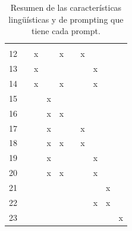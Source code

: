 \begin{landscape}
\begin{table}[]
{\begin{tabular}{@{}clllllllll@{}}
   &
   &
   \\
12 &
   &
  \multicolumn{1}{c}{x} &
   &
  \multicolumn{1}{c}{x} &
   &
  \multicolumn{1}{c}{x} &
   &
   &
   \\
13 &
   &
  \multicolumn{1}{c}{x} &
   &
   &
   &
   &
  \multicolumn{1}{c}{x} &
   &
   \\
14 &
   &
  \multicolumn{1}{c}{x} &
   &
  \multicolumn{1}{c}{x} &
   &
   &
  \multicolumn{1}{c}{x} &
   &
   \\
15 &
   &
   &
  \multicolumn{1}{c}{x} &
   &
   &
   &
   &
   &
   \\
16 &
   &
   &
  \multicolumn{1}{c}{x} &
  \multicolumn{1}{c}{x} &
   &
   &
   &
   &
   \\
17 &
   &
   &
  \multicolumn{1}{c}{x} &
   &
   &
  \multicolumn{1}{c}{x} &
   &
   &
   \\
18 &
   &
   &
  \multicolumn{1}{c}{x} &
  \multicolumn{1}{c}{x} &
   &
  \multicolumn{1}{c}{x} &
   &
   &
   \\
19 &
   &
   &
  \multicolumn{1}{c}{x} &
   &
   &
   &
  \multicolumn{1}{c}{x} &
   &
   \\
20 &
   &
   &
  \multicolumn{1}{c}{x} &
  \multicolumn{1}{c}{x} &
   &
   &
  \multicolumn{1}{c}{x} &
   &
   \\
21 &
   &
   &
   &
   &
   &
   &
   &
  \multicolumn{1}{c}{x} &
   \\
22 &
   &
   &
   &
   &
   &
   &
  \multicolumn{1}{c}{x} &
  \multicolumn{1}{c}{x} &
   \\
23 &
   &
   &
   &
   &
   &
   &
   &
   &
  \multicolumn{1}{c}{x} \\ \bottomrule
\end{tabular}}
\caption{Resumen de las características lingüísticas y de prompting que tiene cada prompt.}
\label{tab:resumen_prompts}
\end{table}
\end{landscape}